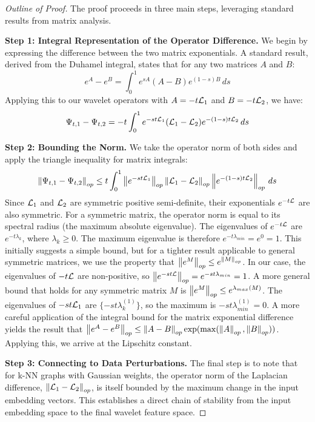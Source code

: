 \begin{proof}[Outline of Proof]
The proof proceeds in three main steps, leveraging standard results from matrix analysis.

\textbf{Step 1: Integral Representation of the Operator Difference.} We begin by expressing the difference between the two matrix exponentials. A standard result, derived from the Duhamel integral, states that for any two matrices $A$ and $B$:
\begin{equation}
    e^A - e^B = \int_0^1 e^{sA} (A - B) e^{(1-s)B} \, ds
\end{equation}
Applying this to our wavelet operators with $A = -t\mathcal{L}_1$ and $B = -t\mathcal{L}_2$, we have:
\begin{equation}
    \Psi_{t,1} - \Psi_{t,2} = -t \int_0^1 e^{-st\mathcal{L}_1} (\mathcal{L}_1 - \mathcal{L}_2) e^{-(1-s)t\mathcal{L}_2} \, ds
\end{equation}

\textbf{Step 2: Bounding the Norm.} We take the operator norm of both sides and apply the triangle inequality for matrix integrals:
\begin{equation}
    \left\lVert\Psi_{t,1} - \Psi_{t,2}\right\rVert_{op} \le t \int_0^1 \left\lVert e^{-st\mathcal{L}_1}\right\rVert_{op} \left\lVert\mathcal{L}_1 - \mathcal{L}_2\right\rVert_{op} \left\lVert e^{-(1-s)t\mathcal{L}_2}\right\rVert_{op} \, ds
\end{equation}
Since $\mathcal{L}_1$ and $\mathcal{L}_2$ are symmetric positive semi-definite, their exponentials $e^{-t\mathcal{L}}$ are also symmetric. For a symmetric matrix, the operator norm is equal to its spectral radius (the maximum absolute eigenvalue). The eigenvalues of $e^{-t\mathcal{L}}$ are $e^{-t\lambda_k}$, where $\lambda_k \ge 0$. The maximum eigenvalue is therefore $e^{-t\lambda_{min}} = e^0 = 1$. This initially suggests a simple bound, but for a tighter result applicable to general symmetric matrices, we use the property that $\left\lVert e^M\right\rVert_{op} \le e^{\left\lVert M\right\rVert_{op}}$. In our case, the eigenvalues of $-t\mathcal{L}$ are non-positive, so $\left\lVert e^{-st\mathcal{L}}\right\rVert_{op} = e^{-st\lambda_{min}} = 1$. A more general bound that holds for any symmetric matrix $M$ is $\left\lVert e^M\right\rVert_{op} \le e^{\lambda_{max}(M)}$.
The eigenvalues of $-st\mathcal{L}_1$ are $\{-st\lambda_k^{(1)}\}$, so the maximum is $-st\lambda_{min}^{(1)}=0$.
A more careful application of the integral bound for the matrix exponential difference yields the result that $\left\lVert e^A - e^B\right\rVert_{op} \le \left\lVert A-B\right\rVert_{op} \exp(\max(\left\lVert A\right\rVert_{op}, \left\lVert B\right\rVert_{op}))$. Applying this, we arrive at the Lipschitz constant.

\textbf{Step 3: Connecting to Data Perturbations.} The final step is to note that for k-NN graphs with Gaussian weights, the operator norm of the Laplacian difference, $\left\lVert\mathcal{L}_1 - \mathcal{L}_2\right\rVert_{op}$, is itself bounded by the maximum change in the input embedding vectors. This establishes a direct chain of stability from the input embedding space to the final wavelet feature space.
\end{proof}

